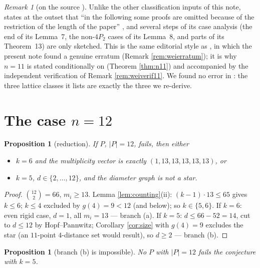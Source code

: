 \documentclass[11pt]{article}
\newtheorem{proposition}[theorem]{Proposition}
\theoremstyle{definition}
\theoremstyle{remark}
\newtheorem{remark}[theorem]{Remark}
\begin{document}
\begin{remark}[on the source \cite{Wei11}]\label{rem:weiomit}
Unlike the other classification inputs of this note, \cite{Wei11} states at the outset
that ``in the following some proofs are omitted because of the restriction of the length
of the paper'' \cite[p.~506]{Wei11}, and several steps of its case analysis (the end of
its Lemma~7, the non-$4P_2$ cases of its Lemma~8, and parts of its Theorem~13) are only
sketched. This is the same editorial style as \cite{Wei12}, in which the present note
found a genuine erratum (Remark \ref{rem:weierratum}); it is why $n = 11$ is stated
conditionally on \cite{Wei11} (Theorem \ref{thm:n11}) and accompanied by the independent
verification of Remark \ref{rem:weiverif11}. We found no error in \cite{Wei11}: the three
lattice classes it lists are exactly the three we re-derive.
\end{remark}

\section{The case $n = 12$}\label{sec:n12}

\begin{proposition}[reduction]\label{prop:n12red}
If $P$, $|P| = 12$, fails, then either
\begin{itemize}
\item[(a)] $k = 6$ and the multiplicity vector is exactly $(1, 13, 13, 13, 13, 13)$, or
\item[(b)] $k = 5$, $d \in \{2, \dots, 12\}$, and the diameter graph is not a star.
\end{itemize}
\end{proposition}

\begin{proof}
$\binom{12}{2} = 66$, $m_i \ge 13$. Lemma \ref{lem:counting}(ii): $(k-1) \cdot 13 \le 65$
gives $k \le 6$; $k \le 4$ excluded by $g(4) = 9 < 12$ (and below); so $k \in \{5, 6\}$.
If $k = 6$: even rigid case, $d = 1$, all $m_i = 13$ --- branch (a). If $k = 5$:
$d \le 66 - 52 = 14$, cut to $d \le 12$ by Hopf--Pannwitz; Corollary \ref{cor:size} with
$g(4) = 9$ excludes the star (an $11$-point $4$-distance set would result), so
$d \ge 2$ --- branch (b).
\end{proof}

\begin{proposition}[branch (b) is impossible]\label{prop:n12k5}
No $P$ with $|P| = 12$ fails the conjecture with $k = 5$.
\end{proposition}
\end{document}
